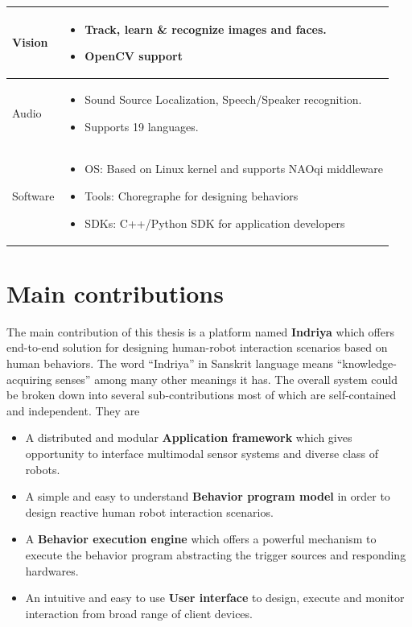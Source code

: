\begin{table}[H]
\begin{tabular}{ | l | p{12cm} |}
  Vision & \begin{itemize}[leftmargin=*,topsep={0pt},itemsep={0pt},partopsep={0pt},parsep={0pt}] \item Track, learn \& recognize images and faces. \item OpenCV support \end{itemize} \\
                                          \hline

  Audio & \begin{itemize}[leftmargin=*,topsep={0pt},itemsep={0pt},partopsep={0pt},parsep={0pt}] \item Sound Source Localization, Speech/Speaker recognition. \item Supports 19 languages.\end{itemize} \\
                                          \hline
  Software & \begin{itemize}[leftmargin=*,topsep={0pt},itemsep={0pt},partopsep={0pt},parsep={0pt}] \item OS: Based on Linux kernel and supports NAOqi middleware
  							\item Tools: Choregraphe \cite{Choregraphe} for designing behaviors
  							\item SDKs: C++/Python SDK for application developers \end{itemize} \\
                                          \hline
    \end{tabular}
\end{table}
\section{Main contributions}
\label{sec:contributions}
The main contribution of this thesis is a platform named \textbf{Indriya} which offers end-to-end solution for designing human-robot interaction scenarios based on human behaviors. The word ``Indriya'' in Sanskrit language means ``knowledge-acquiring senses'' among many other meanings it has. The overall system could be broken down into several sub-contributions most of which are self-contained and independent. They are
\begin{itemize}
\item A distributed and modular \textbf{Application framework} which gives opportunity to interface multimodal sensor systems and diverse class of robots.
\item A simple and easy to understand \textbf{Behavior program model} in order to design reactive human robot interaction scenarios.
\item A \textbf{Behavior execution engine} which offers a powerful mechanism to execute the behavior program abstracting the trigger sources and responding hardwares.
\item An intuitive and easy to use \textbf{User interface} to design, execute and monitor interaction from broad range of client devices.
\end{itemize}

